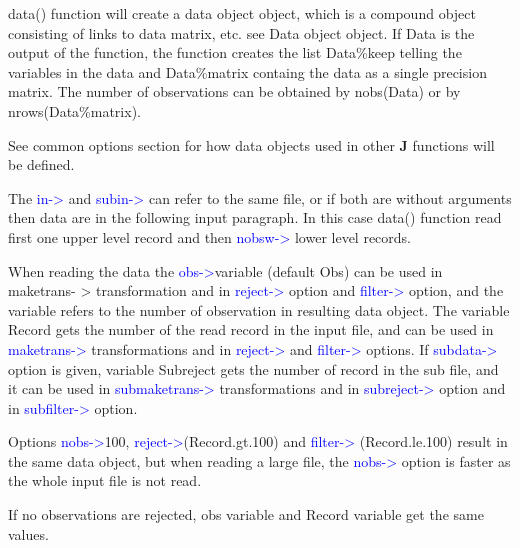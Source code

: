 \begin{note}
\textcolor{VioletRed}{data}() function will create a data object object, which is a compound object consisting
of links to data matrix, etc. see Data object object. If Data is the output
of the function, the function creates the list Data\%keep telling the
variables in the data and
Data\%matrix containg the data as a single precision matrix. The number of observations can be obtained by \textcolor{VioletRed}{nobs}(Data) or by
\textcolor{VioletRed}{nrows}(Data\%matrix).
\end{note}
\begin{note}
See common options section for how data objects used in other \textbf{J} functions will be defined.
\end{note}
\begin{note}
The \textcolor{blue}{in->} and \textcolor{blue}{subin->} can refer to the same file, or if both are without arguments
then data are in the following input paragraph. In this case \textcolor{VioletRed}{data}() function read first one
upper level record and then \textcolor{blue}{nobsw->} lower level records.
\end{note}
\begin{note}
When reading the data the \textcolor{blue}{obs->}variable (default Obs) can be used in maketrans-
> transformation and in \textcolor{blue}{reject->} option and \textcolor{blue}{filter->} option, and the variable refers to
the number of observation in resulting data object. The variable Record gets the number of
the read record in the input file, and can be used in \textcolor{blue}{maketrans->} transformations and in
\textcolor{blue}{reject->} and \textcolor{blue}{filter->} options. If \textcolor{blue}{subdata->} option is given, variable Subreject gets
the number of record in the sub file, and it can be used in \textcolor{blue}{submaketrans->} transformations
and in \textcolor{blue}{subreject->} option and in \textcolor{blue}{subfilter->} option.
\end{note}
\begin{note}
Options \textcolor{blue}{nobs->}100, \textcolor{blue}{reject->}(Record.gt.100) and \textcolor{blue}{filter->}
(Record.le.100) result in the same data object, but when reading a large file, the \textcolor{blue}{nobs->}
option is faster as the whole input file is not read.
\end{note}
\begin{note}
If no observations are rejected, obs variable and Record variable get the same values.
\end{note}
